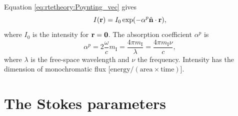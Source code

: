 Equation \ref{eq:rtetheory:Poynting_vec} gives
\begin{equation}
  I(\mathbf{r}) = I_0 \exp(-\alpha^p \hat{{\bf n}} \cdot \mathbf{r}),
\end{equation}
where $I_0$ is the intensity for $\mathbf{r} = \mathbf{0}$. The absorption
coefficient $\alpha^p$ is
\begin{equation}
  \alpha^p =
  2 \frac{\omega}{c} m_{\mathrm{I}} =
    \frac{4\pi m_{\mathrm{I}}}{\lambda} =
    \frac{4\pi m_{\mathrm{I}}\nu}{c},
\end{equation}
where $\lambda$ is the free-space wavelength and $\nu$ the frequency.
Intensity has the dimension of monochromatic flux
[$\mathrm{energy}/(\mathrm{area}\times\mathrm{time})$].
  

\section[The Stokes parameters]{The Stokes parameters}
\label{sec:rtetheory:Stokes_components}
  

